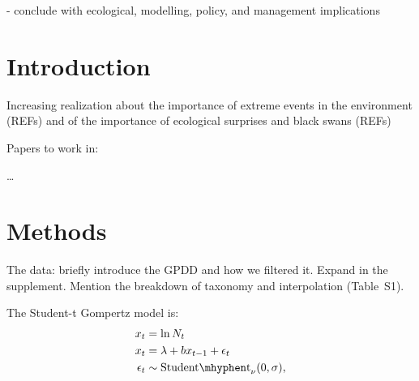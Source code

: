 \documentclass[11pt]{article}
\begin{document}
- conclude with ecological, modelling, policy, and management implications

\section{Introduction}

Increasing realization about the importance of extreme events in the environment (REFs)
and of the importance of ecological surprises and black swans (REFs)

Papers to work in:

\citep{inchausti2002,halley2002,inchausti2001}

\citep{jentsch2007}

\citep{ward2007}

\citep{garcia-carreras2011}
\citep{sornette2009}

\citep{nunez2012}

\citep{thompson2013}
\citep{beaugrand2012}
\citep{pine-iii2009}

\citep{doak2008}

\citep{smale2013}

\citep{easterling2000}
\citep{scheffer2003}
\citep{katz2005}

\citep{taleb2007}

\citep{vasseur2014}

\citep{vert-pre2013}
\citep{lindenmayer2010}

\citep{valpine2002} 
\citep{gregory2010}
\citet{garcia-carreras2011}
\citet{brook2006}
\citep{herrandoprez2014}

\ldots

\section{Methods}

The data: briefly introduce the GPDD and how we filtered it. Expand in the supplement. Mention the breakdown of taxonomy and interpolation (Table~S1).

The Student-t Gompertz model is:
\begin{align*}
x_t &= \ln N_t\\
x_t &= \lambda + b x_{t-1} + \epsilon_t\\
\epsilon_t &\sim \mathrm{Student\mhyphen t}_\nu(0, \sigma),
\end{align*}
\end{document}
